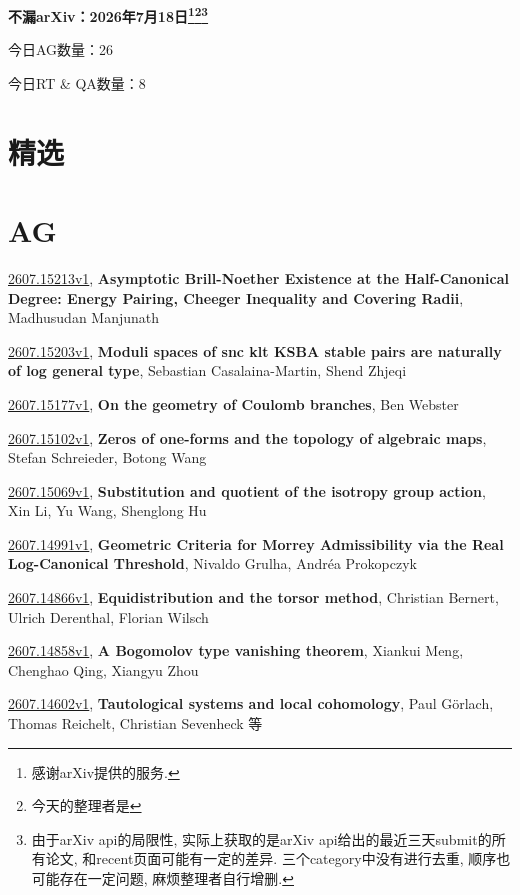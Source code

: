 \documentclass[9pt, a4paper]{article}
\theoremstyle{plain}
\theoremstyle{definition}
\theoremstyle{remark}
\newcommand{\arxiv}[3]{\href{https://arxiv.org/abs/#1}{#1}, \textbf{\textcolor{arxivblue}{#2}}, #3}
\newcommand{\AGnumber}{26}
\newcommand{\RTQAnumber}{8}
\newcommand{\NewestDate}{2026年7月18日}
\newcommand{\todayarXiver}{} %
\begin{document}
\begin{center}
    \Huge\textbf{不漏arXiv：\NewestDate\footnote{感谢arXiv提供的服务.}\footnote{今天的整理者是\todayarXiver}\footnote{由于arXiv api的局限性, 实际上获取的是arXiv api给出的最近三天submit的所有论文, 和recent页面可能有一定的差异. 三个category中没有进行去重, 顺序也可能存在一定问题, 麻烦整理者自行增删.}} \\
\end{center}

\setcounter{section}{-1}

\begin{center}
    今日AG数量：\AGnumber
    
    今日RT \& QA数量：\RTQAnumber
    
\end{center}


\section{精选}


\section{AG}
\arxiv{2607.15213v1}{Asymptotic Brill-Noether Existence at the Half-Canonical Degree: Energy Pairing, Cheeger Inequality and Covering Radii}{Madhusudan Manjunath}

\arxiv{2607.15203v1}{Moduli spaces of snc klt KSBA stable pairs are naturally of log general type}{Sebastian Casalaina-Martin, Shend Zhjeqi}

\arxiv{2607.15177v1}{On the geometry of Coulomb branches}{Ben Webster}

\arxiv{2607.15102v1}{Zeros of one-forms and the topology of algebraic maps}{Stefan Schreieder, Botong Wang}

\arxiv{2607.15069v1}{Substitution and quotient of the isotropy group action}{Xin Li, Yu Wang, Shenglong Hu}

\arxiv{2607.14991v1}{Geometric Criteria for Morrey Admissibility via the Real Log-Canonical Threshold}{Nivaldo Grulha, Andréa Prokopczyk}

\arxiv{2607.14866v1}{Equidistribution and the torsor method}{Christian Bernert, Ulrich Derenthal, Florian Wilsch}

\arxiv{2607.14858v1}{A Bogomolov type vanishing theorem}{Xiankui Meng, Chenghao Qing, Xiangyu Zhou}

\arxiv{2607.14602v1}{Tautological systems and local cohomology}{Paul Görlach, Thomas Reichelt, Christian Sevenheck 等}
\end{document}

